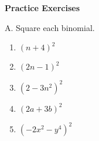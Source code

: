 \textbf{Practice Exercises}

\vspce

A. Square each binomial.   
\begin{enumerate}

\item \hspce $(n + 4)^2$
\item \hspce $(2n - 1)^2$
\item \hspce $(2 - 3n^{2})^2$
\item \hspce $(2a + 3b)^{2}$
\item \hspce $(-2x^{2} - y^{4})^{2}$
\end{enumerate}